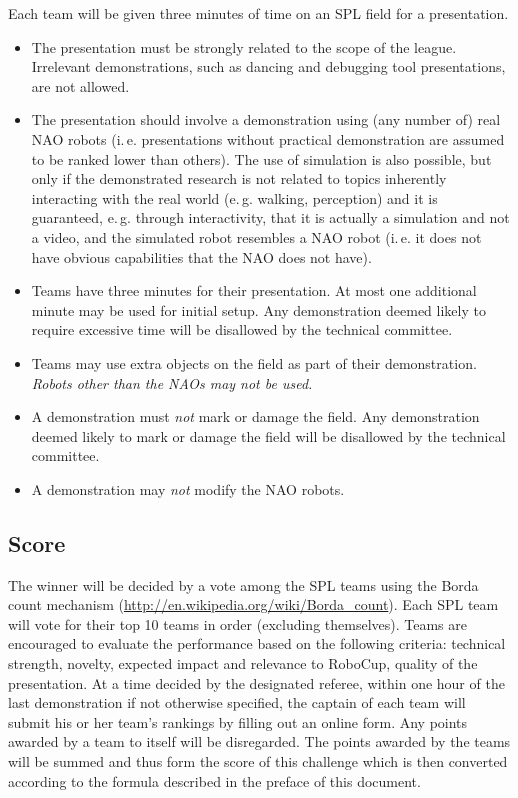 \documentclass[12pt]{article}
\newcommand{\ie}{\mbox{i.\,e.}\xspace}
\newcommand{\eg}{\mbox{e.\,g.}\xspace}
\begin{document}
Each team will be given three minutes of time on an SPL field for a presentation.

\begin{itemize}
\item The presentation must be strongly related to the scope of the league. Irrelevant demonstrations, such as dancing and debugging tool presentations, are not allowed.
\item The presentation should involve a demonstration using (any number of) real NAO robots (\ie presentations without practical demonstration are assumed to be ranked lower than others). The use of simulation is also possible, but only if the demonstrated research is not related to topics inherently interacting with the real world (\eg walking, perception) and it is guaranteed, \eg through interactivity, that it is actually a simulation and not a video, and the simulated robot resembles a NAO robot (\ie it does not have obvious capabilities that the NAO does not have).
\item Teams have three minutes for their presentation. At most one additional minute may be used for initial setup. Any demonstration deemed likely to require excessive time will be disallowed by the technical committee.
\item Teams may use extra objects on the field as part of their demonstration. \emph{Robots other than the NAOs may not be used.}
\item A demonstration must \emph{not} mark or damage the field. Any demonstration deemed likely to mark or damage the field will be disallowed by the technical committee.
\item A demonstration may \emph{not} modify the NAO robots.
\end{itemize}

\subsection{Score}

The winner will be decided by a vote among the SPL teams using the Borda count mechanism (\url{http://en.wikipedia.org/wiki/Borda_count}). Each SPL team will vote for their top 10 teams in order (excluding themselves). Teams are encouraged to evaluate the performance based on the following criteria: technical strength, novelty, expected impact and relevance to RoboCup, quality of the presentation. At a time decided by the designated referee, within one hour of the last demonstration if not otherwise specified, the captain of each team will submit his or her team's rankings by filling out an online form. Any points awarded by a team to itself will be disregarded. The points awarded by the teams will be summed and thus form the score of this challenge which is then converted according to the formula described in the preface of this document.
\end{document}
